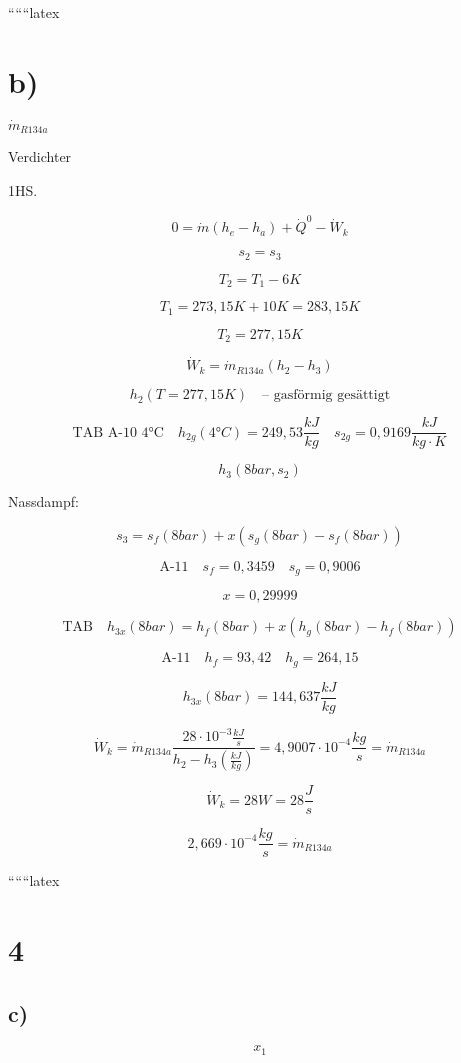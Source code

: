 ``````latex


\section*{b)}

\(\dot{m}_{R134a}\)

Verdichter

1HS.

\[
0 = \dot{m}(h_e - h_a) + \dot{Q}^0 - \dot{W}_k
\]

\[
s_2 = s_3
\]

\[
T_2 = T_1 - 6K
\]

\[
T_1 = 273{,}15K + 10K = 283{,}15K
\]

\[
T_2 = 277{,}15K
\]

\[
\dot{W}_k = \dot{m}_{R134a} (h_2 - h_3)
\]

\[
h_2 (T = 277{,}15K) \quad \text{-- gasförmig gesättigt}
\]

\[
\text{TAB A-10 4°C} \quad h_{2g} (4°C) = 249{,}53 \frac{kJ}{kg} \quad s_{2g} = 0{,}9169 \frac{kJ}{kg \cdot K}
\]

\[
h_3 (8 bar, s_2)
\]

Nassdampf:

\[
s_3 = s_f (8 bar) + x (s_g (8 bar) - s_f (8 bar))
\]

\[
\text{A-11} \quad s_f = 0{,}3459 \quad s_g = 0{,}9006
\]

\[
x = 0{,}29999
\]

\[
\text{TAB} \quad h_{3x} (8 bar) = h_f (8 bar) + x (h_g (8 bar) - h_f (8 bar))
\]

\[
\text{A-11} \quad h_f = 93{,}42 \quad h_g = 264{,}15
\]

\[
h_{3x} (8 bar) = 144{,}637 \frac{kJ}{kg}
\]

\[
\dot{W}_k = \dot{m}_{R134a} \frac{28 \cdot 10^{-3} \frac{kJ}{s}}{h_2 - h_3 \left( \frac{kJ}{kg} \right)} = 4{,}9007 \cdot 10^{-4} \frac{kg}{s} = \dot{m}_{R134a}
\]

\[
\dot{W}_k = 28W = 28 \frac{J}{s}
\]

\[
2{,}669 \cdot 10^{-4} \frac{kg}{s} = \dot{m}_{R134a}
\]

``````latex

\section*{4}

\subsection*{c)}
\[ x_1 \]

